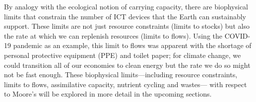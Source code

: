 \documentclass{article}
\begin{document}

By analogy with the ecological notion of carrying capacity, there are biophysical limits that constrain the number of ICT devices that the Earth can sustainably support. These limits are not just resource constraints (limits to stocks) but also the rate at which we can replenish resources (limits to flows). Using the COVID-19 pandemic as an example, this limit to flows was apparent with the shortage of personal protective equipment (PPE) and toilet paper; for climate change, we could transition all of our economies to clean energy but the rate we do so might not be fast enough. %
These biophysical limits---including resource constraints, limits to flows, assimilative capacity, nutrient cycling and wastes--- with respect to Moore's will be explored in more detail in the upcoming sections.
\end{document}
